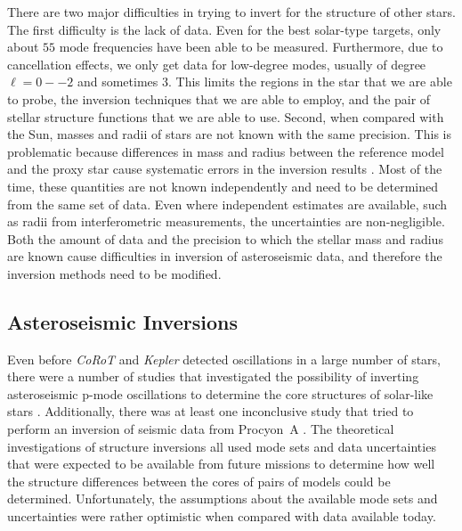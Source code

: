 There are two major difficulties in trying to invert for the structure of other stars.
The first difficulty is the lack of data. 
Even for the best solar-type targets, only about $55$ mode frequencies have been able to be measured. 
Furthermore, due to cancellation effects, we only get data for low-degree modes, usually of degree ${\ell=0--2}$ and sometimes $3$. 
This limits the regions in the star that we are able to probe, the inversion techniques that we are able to employ, and the pair of stellar structure functions that we are able to use. 
Second, when compared with the Sun, masses and radii of stars are not known with the same precision. 
This is problematic because differences in mass and radius between the reference model and the proxy star cause systematic errors in the inversion results \citep[see][]{2003Ap&SS.284..153B}. 
Most of the time, these quantities are not known independently and need to be determined from the same set of data. 
Even where independent estimates are available, such as radii from interferometric measurements, the uncertainties are non-negligible. 
Both the amount of data and the precision to which the stellar mass and radius are known cause difficulties in inversion of asteroseismic data, and therefore the inversion methods need to be modified. 



\subsection{Asteroseismic Inversions} 
\label{sec:asteroseismic-inversions}

Even before {\it CoRoT} and {\it Kepler} detected oscillations in a large number of stars, there were a number of studies that investigated the possibility of inverting asteroseismic p-mode oscillations to determine the core structures of solar-like stars \citep{1993ASPC...40..541G,
1998mons.proc...33G, 2001ESASP.464..411B, 2001ESASP.464..407B,
2002ESASP.485..249B, 2003Ap&SS.284..153B}. 
Additionally, there was at least one inconclusive study that tried to perform an inversion of seismic data from Procyon~A \citep{2004ESASP.559..186D}. 
The theoretical investigations of structure inversions all used mode sets and data uncertainties that were expected to be available from future missions to determine how well the structure differences between the cores of pairs of models could be determined. 
Unfortunately, the assumptions about the available mode sets and uncertainties were rather optimistic when compared with data available today. 



